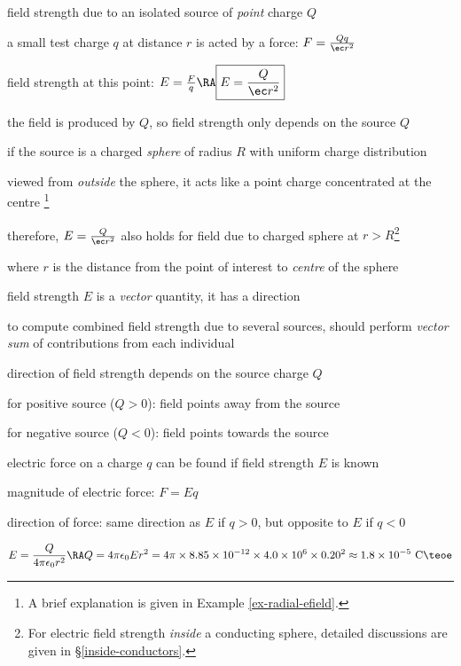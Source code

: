 \cmt field strength due to an isolated source of \emph{point} charge $Q$

a small test charge $q$ at distance $r$ is acted by a force: $F = \frac{Qq}{\ec r^2}$

field strength at this point: $ E = \frac{F}{q} \RA \boxed{E=\frac{Q}{\ec r^2}}$

the field is produced by $Q$, so field strength only depends on the source $Q$

\cmt if the source is a charged \emph{sphere} of radius $R$ with uniform charge distribution

viewed from \emph{outside} the sphere, it acts like a point charge concentrated at the centre
\footnote{A brief explanation is given in Example \ref{ex-radial-efield}.}

therefore, $E=\frac{Q}{\ec r^2}$ also holds for field due to charged sphere at $r>R$\footnote{For electric field strength \emph{inside} a conducting sphere, detailed discussions are given in \S\ref{inside-conductors}.}

where $r$ is the distance from the point of interest to \emph{centre} of the sphere

\cmt field strength $E$ is a \emph{vector} quantity, it has a direction

to compute combined field strength due to several sources, should perform \emph{vector sum} of contributions from each individual

\cmt direction of field strength depends on the source charge $Q$

for positive source ($Q>0$): field points away from the source

for negative source ($Q<0$): field points towards the source

\cmt electric force on a charge $q$ can be found if field strength $E$ is known

magnitude of electric force: $F=Eq$

direction of force: same direction as $E$ if $q>0$, but opposite to $E$ if $q<0$


	
\solc 
\begin{equation*}
	E = \frac{Q}{4\pi\epsilon_0 r^2} \RA Q=4\pi\epsilon_0 Er^2 = 4\pi \times 8.85\times 10^{-12} \times 4.0 \times 10^6 \times 0.20^2 \approx 1.8 \times 10^{-5} \text{ C} \teoe
\end{equation*}



